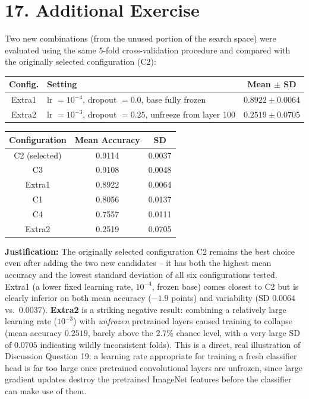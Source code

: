 \documentclass[10pt]{article}
\begin{document}
\section*{17. Additional Exercise}

Two new combinations (from the unused portion of the search space) were
evaluated using the same 5-fold cross-validation procedure and compared
with the originally selected configuration (C2):

\begin{center}
\begin{tabular}{|c|l|c|}
\hline
Config. & Setting & Mean $\pm$ SD\\
\hline
Extra1 & lr $=10^{-4}$, dropout $=0.0$, base fully frozen & $0.8922\pm0.0064$\\
Extra2 & lr $=10^{-3}$, dropout $=0.25$, unfreeze from layer 100 & $0.2519\pm0.0705$\\
\hline
\end{tabular}
\end{center}

\begin{center}
\begin{tabular}{|c|c|c|}
\hline
Configuration & Mean Accuracy & SD\\
\hline
C2 (selected)   & 0.9114 & 0.0037\\
C3              & 0.9108 & 0.0048\\
Extra1          & 0.8922 & 0.0064\\
C1              & 0.8056 & 0.0137\\
C4              & 0.7557 & 0.0111\\
Extra2          & 0.2519 & 0.0705\\
\hline
\end{tabular}
\end{center}

\textbf{Justification:} The originally selected configuration C2 remains
the best choice even after adding the two new candidates -- it has both
the highest mean accuracy and the lowest standard deviation of all six
configurations tested. Extra1 (a lower fixed learning rate, $10^{-4}$,
frozen base) comes closest to C2 but is clearly inferior on both mean
accuracy ($-1.9$ points) and variability (SD $0.0064$ vs.\ $0.0037$).
\textbf{Extra2} is a striking negative result: combining a relatively
large learning rate ($10^{-3}$) with \emph{unfrozen} pretrained layers
caused training to collapse (mean accuracy $0.2519$, barely above the
2.7\% chance level, with a very large SD of $0.0705$ indicating wildly
inconsistent folds). This is a direct, real illustration of Discussion
Question 19: a learning rate appropriate for training a fresh classifier
head is far too large once pretrained convolutional layers are unfrozen,
since large gradient updates destroy the pretrained ImageNet features
before the classifier can make use of them.
\end{document}
